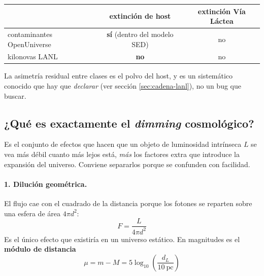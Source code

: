 \documentclass[11pt,a4paper]{article}
\begin{document}
\begin{center}
\begin{tabular}{lcc}
\toprule
 & extinción de host & extinción Vía Láctea \\
\midrule
contaminantes OpenUniverse & \textbf{sí} (dentro del modelo SED) & no \\
kilonovas LANL             & \textbf{no} & no \\
\bottomrule
\end{tabular}
\end{center}

\noindent La asimetría residual entre clases es el polvo del host, y es un sistemático conocido que
hay que \emph{declarar} (ver sección \ref{sec:cadena-lanl}), no un bug que buscar.

\subsection{¿Qué es exactamente el \emph{dimming} cosmológico?}
\label{sec:dimming}

Es el conjunto de efectos que hacen que un objeto de luminosidad intrínseca $L$ se vea más débil
cuanto más lejos está, \emph{más} los factores extra que introduce la expansión del universo.
Conviene separarlos porque se confunden con facilidad.

\paragraph{1. Dilución geométrica.} El flujo cae con el cuadrado de la distancia porque los fotones
se reparten sobre una esfera de área $4\pi d^2$:
\begin{equation}
F = \frac{L}{4\pi d^2}
\end{equation}
Es el único efecto que existiría en un universo estático. En magnitudes es el \textbf{módulo de
distancia}
\begin{equation}
\mu = m - M = 5\log_{10}\!\left(\frac{d_L}{10\ \text{pc}}\right)
\end{equation}
\end{document}
